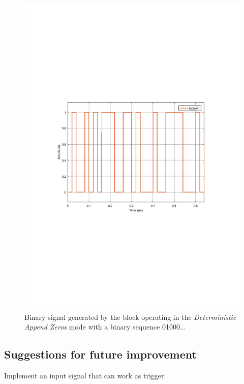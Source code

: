 \begin{figure}
	\centering
	\includegraphics[clip, trim=0.5cm 9cm 0.5cm 9cm, width=\textwidth]{./lib/binary_source/figures/BinarySource_output.pdf}
	
	\caption{Binary signal generated by the block operating in the \textit{Deterministic Append Zeros} mode with a binary sequence 01000...}\label{MQAM1_DeterministAppendZeros}
\end{figure}

\subsection*{Suggestions for future improvement}

Implement an input signal that can work as trigger.

